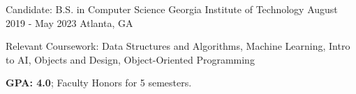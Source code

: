 


\begin{cventries}

\cventry
{Candidate: B.S. in Computer Science}
{Georgia Institute of Technology}
{August 2019 - May 2023}
{Atlanta, GA}
{\begin{cvitems}
\item {Relevant Coursework: Data Structures and Algorithms, Machine Learning, Intro to AI, Objects and Design, Object-Oriented Programming}
\item \textbf{GPA: 4.0}; Faculty Honors for 5 semesters.
\end{cvitems}
}


\end{cventries}
